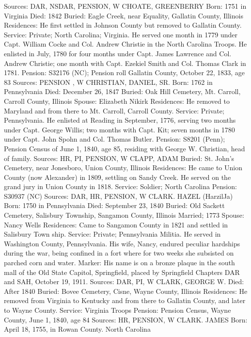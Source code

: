 Sources: DAR, NSDAR, PENSION, W 
CHOATE, GREENBERRY 
Born: 1751 in Virginia 
Died: 1842 
Buried: Eagle Creek, near Equality, Gallatin County, Illinois 
Residences: He first settled in Johnson County but removed to Gallatin County. 
Service: Private; North Carolina; Virginia. He served one month in 1779 under Capt. William Cocke and Col. Andrew Christie in the North Carolina Troops. He enlisted in July, 1780 for four months under Capt. James Lawrence and Col. Andrew Christie; one month with Capt. Ezekiel Smith and Col. Thomas Clark in 1781. 
Pension: S32176 (NC); Pension roll Gallatin County, October 22, 1833, age 83 
Sources: PENSION , W 
CHRISTIAN, DANIEL, SR. 
Born: 1762 in Pennsylvania 
Died: December 26, 1847 
Buried: Oak Hill Cemetery, Mt. Carroll, Carroll County, Illinois 
Spouse: Elizabeth Nikirk 
Residences: He removed to Maryland and from there to Mt. Carroll, Carroll County. 
Service: Private; Pennsylvania. He enlisted at Reading in September, 1776, serv­ing two months under Capt. George Willis; two months with Capt. Kit; seven months in 1780 under Capt. John Spohn and Col. Thomas Butler. 
Pension: S8201 (Penn); Pension Census of June 1, 1840, age 85, residing with George W. Christian, head of family. 
Sources: HR, PI, PENSION, W 
CLAPP, ADAM 
Buried: St. John's Cemetery, near Jonesboro, Union County, Illinois 
Residences: He came to Union County (now Alexander) in 1809, settling on Sandy Creek. He served on the grand jury in Union County in 1818.  
Service: Soldier; North Carolina 
Pension: S30937 (NC) 
Sources: DAR, HR, PENSION, W 
CLARK. HAZEL (HarzilJa) 
Born: 1750 in Pennsylvania 
Died: September 23, 1840 
Buried: Old Sackett Cemetery, Salisbury Township, Sangamon County, Illinois 
Married; 1773 
Spouse: Nancy Wells 
Residences: Came to Sangamon County in 1821 and settled in Salisbury Town­ ship. 
Service: Private; Pennsylvania Militia. He served in Washington County, Penn­sylvania. His wife, Nancy, endured peculiar hardships during the war, being confined in a fort where for two weeks she subsisted on parched corn and water. 
Marker: His name is on a bronze plaque in the south mall of the Old State Capitol, Springfield, placed by Springfield Chapters DAR and SAH, October 19, 1911. 
Sources: DAR, PI, W 
CLARK, GEORGE W. 
Died: After 1840 
Buried: Bovee Cemetery, Cisne, Wayne County, Illinois 
Residences: He removed from Virginia to Kentucky and from there to Gallatin County, and later to Wayne County. 
Service: Virginia Troops 
Pension: Pension Census, Wayne County, June 1, 1840, age 84 
Sources: HR, PENSION, W 
CLARK. JAMES 
Born: April 18, 1755, in Rowan County. North Carolina 
